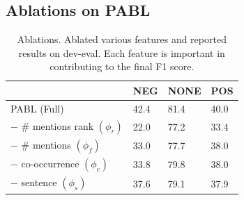 \documentclass[11pt,a4paper]{article}
\begin{document}
\subsection{Ablations on PABL}
\begin{table}[!t]
\centering
\begin{tabular}{| l | l | l | l |}
\hline
	& NEG	& NONE	& POS \\ \hline
PABL (Full)	& 42.4	& 81.4	& 40.0 \\
$-$ \# mentions rank $(\phi_r)$	& 22.0	& 77.2	& 33.4 \\
$-$ \# mentions $(\phi_f)$	& 33.0	& 77.7	& 38.0 \\
$-$ co-occurrence $(\phi_c)$	& 33.8	& 79.8	& 38.0 \\
$-$ sentence $(\phi_s)$	& 37.6	& 79.1	& 37.9 \\
\hline
\end{tabular}
\caption{\label{tab:ablations} Ablations. Ablated various features and reported results on dev-eval. Each feature is important in contributing to the final F1 score.}
\end{table}
\end{document}
